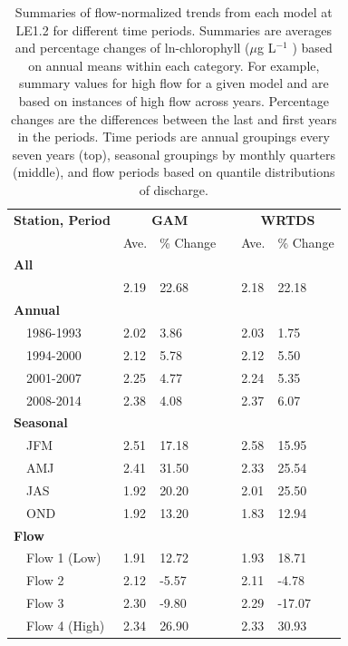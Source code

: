 \documentclass[letterpaper,12pt,oneside]{article}\usepackage[]{graphicx}\usepackage[]{color}
\newcommand{\mugl}{$\mu$g L$^{-1}$ }
\begin{document}
\begin{table}[!tbp]
\caption{Summaries of flow-normalized trends from each model at LE1.2 for different time periods.  Summaries are averages and percentage changes of ln-chlorophyll (\mugl) based on annual means within each category.  For example, summary values for high flow for a given model and are based on instances of high flow across years.  Percentage changes are the differences between the last and first years in the periods.  Time periods are annual groupings every seven years (top), seasonal groupings by monthly quarters (middle), and flow periods based on quantile distributions of discharge.\label{tab:trendsLE12}} 
\begin{center}
\begin{tabular}{lllcll}
\hline\hline
\multicolumn{1}{l}{\bfseries Station, Period}&\multicolumn{2}{c}{\bfseries GAM}&\multicolumn{1}{c}{\bfseries }&\multicolumn{2}{c}{\bfseries WRTDS}\tabularnewline
\cline{2-3} \cline{5-6}
\multicolumn{1}{l}{}&\multicolumn{1}{c}{Ave.}&\multicolumn{1}{c}{\% Change}&\multicolumn{1}{c}{}&\multicolumn{1}{c}{Ave.}&\multicolumn{1}{c}{\% Change}\tabularnewline
\hline
{\bfseries All}&&&&&\tabularnewline
~~&2.19&22.68&&2.18& 22.18\tabularnewline
\hline
{\bfseries Annual}&&&&&\tabularnewline
~~1986-1993&2.02& 3.86&&2.03&  1.75\tabularnewline
~~1994-2000&2.12& 5.78&&2.12&  5.50\tabularnewline
~~2001-2007&2.25& 4.77&&2.24&  5.35\tabularnewline
~~2008-2014&2.38& 4.08&&2.37&  6.07\tabularnewline
\hline
{\bfseries Seasonal}&&&&&\tabularnewline
~~JFM&2.51&17.18&&2.58& 15.95\tabularnewline
~~AMJ&2.41&31.50&&2.33& 25.54\tabularnewline
~~JAS&1.92&20.20&&2.01& 25.50\tabularnewline
~~OND&1.92&13.20&&1.83& 12.94\tabularnewline
\hline
{\bfseries Flow}&&&&&\tabularnewline
~~Flow 1 (Low)&1.91&12.72&&1.93& 18.71\tabularnewline
~~Flow 2&2.12&-5.57&&2.11& -4.78\tabularnewline
~~Flow 3&2.30&-9.80&&2.29&-17.07\tabularnewline
~~Flow 4 (High)&2.34&26.90&&2.33& 30.93\tabularnewline
\hline
\end{tabular}\end{center}

\end{table}
\end{document}
